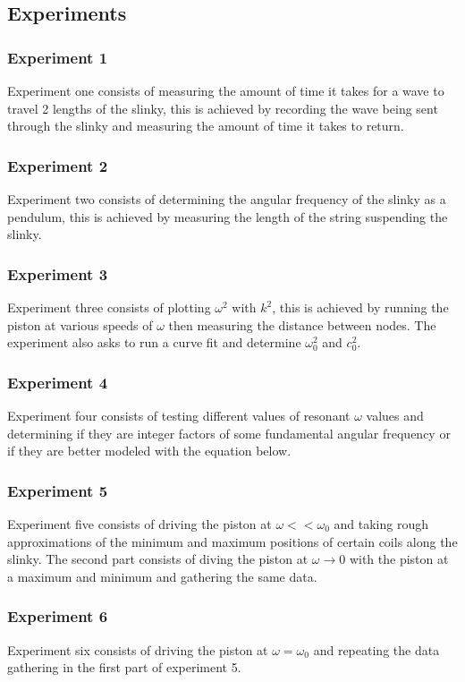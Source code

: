 \documentclass{article}
\begin{document}
\newpage
\subsection*{Experiments}

\subsubsection*{Experiment 1}
Experiment one consists of measuring the amount of time it takes for a wave to
travel 2 lengths of the slinky, this is achieved by recording the wave being
sent through the slinky and measuring the amount of time it takes to return.

\subsubsection*{Experiment 2}
Experiment two consists of determining the angular frequency of the slinky as a
pendulum, this is achieved by measuring the length of the string suspending the
slinky.

\subsubsection*{Experiment 3}
Experiment three consists of plotting $\omega^2$ with $k^2$, this is achieved by
running the piston at various speeds of $\omega$ then measuring the distance
between nodes. The experiment also asks to run a curve fit and determine
$\omega_0^2$ and $c_0^2$.

\subsubsection*{Experiment 4}
Experiment four consists of testing different values of resonant $\omega$ values
and determining if they are integer factors of some fundamental angular
frequency or if they are better modeled with the equation below.

\subsubsection*{Experiment 5}
Experiment five consists of driving the piston at $\omega << \omega_0$ and
taking rough approximations of the minimum and maximum positions of certain
coils along the slinky. The second part consists of diving the piston at
$\omega \rightarrow 0$ with the piston at a maximum and minimum and gathering
the same data.

\subsubsection*{Experiment 6}
Experiment six consists of driving the piston at $\omega = \omega_0$ and
repeating the data gathering in the first part of experiment 5.
\end{document}
